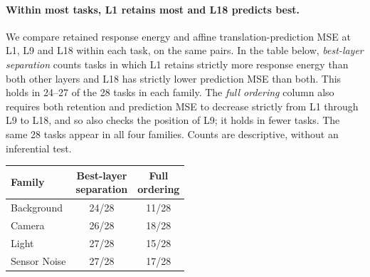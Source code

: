 \paragraph{Within most tasks, L1 retains most and L18 predicts best.}
We compare retained response energy and affine translation-prediction MSE at L1, L9 and L18 within each task, on the same pairs. In the table below, \emph{best-layer separation} counts tasks in which L1 retains strictly more response energy than both other layers and L18 has strictly lower prediction MSE than both. This holds in 24--27 of the 28 tasks in each family. The \emph{full ordering} column also requires both retention and prediction MSE to decrease strictly from L1 through L9 to L18, and so also checks the position of L9; it holds in fewer tasks. The same 28 tasks appear in all four families. Counts are descriptive, without an inferential test.

\begin{center}
\small
\setlength{\tabcolsep}{4pt}
\begin{tabular}{lcc}
\toprule
Family & \shortstack{Best-layer\\separation} & \shortstack{Full\\ordering}\\
\midrule
Background & 24/28 & 11/28\\
Camera & 26/28 & 18/28\\
Light & 27/28 & 15/28\\
Sensor Noise & 27/28 & 17/28\\
\bottomrule
\end{tabular}
\end{center}
